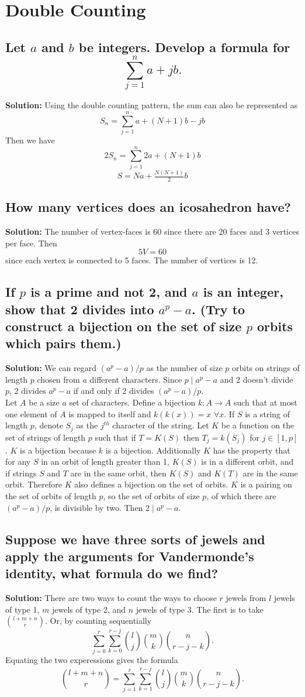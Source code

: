 \documentclass{article}
\newcommand{\exercise}[1]{\subsection{\normalfont #1}}
\newcommand{\solution}{\indent\indent \textbf{Solution: }}
\begin{document}
\setcounter{section}{1}
\section{Double Counting}

\exercise{Let $a$ and $b$ be integers. Develop a formula for
$$\sum^n_{j=1} a + jb.$$ }
\solution Using the double counting pattern, the sum can also be represented as 
$$S_n =\sum^n_{j=1}a + (N+1)b - jb$$
Then we have 
$$2S_n = \sum^n_{j=1} 2a + (N+1)b$$
$$S = Na + \tfrac{N(N+1)}{2}b$$

\exercise{How many vertices does an icosahedron have?}
\solution{The number of vertex-faces is 60 since there are 20 faces and 3 vertices per face. Then 
$$5V = 60$$
since each vertex is connected to 5 faces. The number of vertices is 12.}

\exercise{If $p$ is a prime and not 2, and $a$ is an integer, show that 2 divides into $a^p - a$. (Try to construct a bijection on the set of size $p$ orbits which pairs them.)}
\solution{We can regard $(a^p -a)/p$ as the number of size $p$ orbits on strings of length $p$ chosen from $a$ different characters. Since $p \mid a^p -a$ and 2 doesn't divide $p$, 2 divides $a^p-a$ if and only if 2 divides $(a^p-a)/p$. \\ \indent Let $A$ be a size $a$ set of characters. Define a bijection $k:A\to A$ such that at most one element of $A$ is mapped to itself and $k(k(x)) = x$ $\forall x$. If $S$ is a string of length $p$, denote $S_j$ as the $j^{th}$ character of the string. Let $K$ be a function on the set of strings of length $p$ such that if $T = K(S)$ then $T_j = k(S_j)$ for $j \in [1,p]$. $K$ is a bijection because $k$ is a bijection. Additionally $K$ has the property that for any $S$ in an orbit of length greater than 1, $K(S)$ is in a different orbit, and if strings $S$ and $T$ are in the same orbit, then $K(S)$ and $K(T)$ are in the same orbit. Therefore $K$ also defines a bijection on the set of orbits. $K$ is a pairing on the set of orbits of length $p$, so the set of orbits of size $p$, of which there are $(a^p - a)/p$, is divisible by two. Then $2\mid a^p -a$.}

\exercise{Suppose we have three sorts of jewels and apply the arguments for Vandermonde's identity, what formula do we find?}
\solution
There are two ways to count the ways to choose $r$ jewels from $l$ jewels of type 1, $m$ jewels of type 2, and $n$ jewels of type 3. The first is to take ${l+m+n \choose r}$. Or, by counting sequentially
\[\sum^{r}_{j=0} \sum^{r-j}_{k=0} {l\choose j} {m\choose k} {n\choose r-j-k}. \]
Equating the two experessions gives the formula
\[ {l+m+n\choose r} = \sum^{r}_{j=1} \sum^{r-j}_{k=1} {l\choose j} {m\choose k} {n\choose r-j-k}. \]
\end{document}

